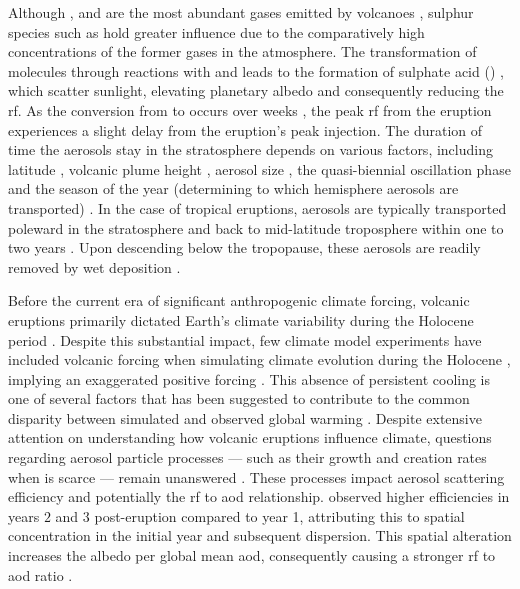 \documentclass{ametsocV6.1}
\begin{document}
Although ,  and  are the most abundant gases emitted by volcanoes
\citep{robock2000}, sulphur species such as  hold greater influence due to the
comparatively high concentrations of the former gases in the atmosphere. The
transformation of  molecules through reactions with  and  leads
to the formation of sulphate acid () \citep{robock2000}, which scatter
sunlight, elevating planetary albedo and consequently reducing the \gls{rf}. As the
conversion from  to  occurs over weeks \citep{robock2000}, the peak
\gls{rf} from the eruption experiences a slight delay from the eruption's peak 
injection. The duration of time the  aerosols stay in the stratosphere depends
on various factors, including latitude \citep{marshall2019, toohey2019}, volcanic plume
height \citep{marshall2019}, aerosol size \citep{marshall2019}, the quasi-biennial
oscillation phase \citep{pitari2016b} and the season of the year (determining to which
hemisphere aerosols are transported) \citep{toohey2011,toohey2019}. In the case of
tropical eruptions, aerosols are typically transported poleward in the stratosphere and
back to mid-latitude troposphere within one to two years \citep{robock2000}. Upon
descending below the tropopause, these aerosols are readily removed by wet deposition
\citep{liu2012}.

Before the current era of significant anthropogenic climate forcing, volcanic eruptions
primarily dictated Earth's climate variability during the Holocene period
\citep{sigl2022}. Despite this substantial impact, few climate model experiments have
included volcanic forcing when simulating climate evolution during the Holocene
\citep{sigl2022}, implying an exaggerated positive forcing
\citep{gregory2016,solomon2011}. This absence of persistent cooling is one of several
factors that has been suggested to contribute to the common disparity between simulated
and observed global warming \citep{andersson2015}. Despite extensive attention on
understanding how volcanic eruptions influence climate, questions regarding aerosol
particle processes --- such as their growth and creation rates when  is scarce
--- remain unanswered
\citep[e.g.][]{robock2000,zanchettin2019,marshall2020,marshall2022}. These processes
impact aerosol scattering efficiency and potentially the \gls{rf} to \gls{aod}
relationship. \citet{marshall2020} observed higher efficiencies in years \(2\) and \(3\)
post-eruption compared to year 1, attributing this to spatial concentration in the
initial year and subsequent dispersion. This spatial alteration increases the albedo per
global mean \gls{aod}, consequently causing a stronger \gls{rf} to \gls{aod} ratio
\citep{marshall2020}.
\end{document}
